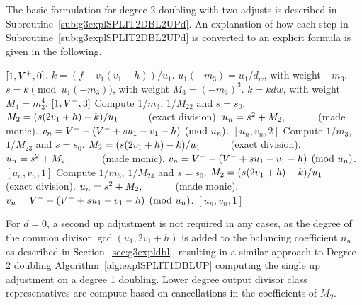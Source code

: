 The basic formulation for degree 2 doubling with two adjusts is described in
Subroutine~\ref{sub:g3explSPLIT2DBL2UPd}. An explanation of how each step in
Subroutine~\ref{sub:g3explSPLIT2DBL2UPd} is converted to an explicit formula is
given in the following.

\begin{algorithm}[htbp]
\caption{Genus 3 Split Model Degree 2 Doubling with two Up Adjusts ($d = 0$)\label{sub:g3explSPLIT2DBL2UPd}}
\begin{algorithmic} [1]
 \hspace{1pt} \Return $[1,V^{+},0]$.
\EndIf
\State $k = (f - v_1(v_1 + h))/u_1$.
\State $u_1(-m_3) = u_1/d_w$, with weight $-m_3$.
\State $s = k \pmod{u_1(-m_3)}$, with weight $M_3 = (-m_3)^3$.
\State $k = kdw$, with weight $M_4 = m_3^4$.
         \Return $[1,V^{-},3]$
        \Else \hspace{3pt} Compute $1/m_3$, $1/M_{22}$ and $s = s_0$.
            \State $M_2 = (s(2v_1 + h) - k)/u_1 \quad\quad\quad $(exact division).
            \State $u_n = s^2 + M_2, \quad\quad\quad $ (made monic).
            \State $v_n = V^{-} - (V^{-} + su_1 - v_1 - h) \pmod{u_n}$.
            \State \Return $[u_n,v_n,2]$
        \EndIf
    \Else \hspace{3pt} Compute $1/m_3$, $1/M_{23}$ and $s = s_0$.
        \State $M_2 = (s(2v_1 + h) - k)/u_1 \quad\quad\quad $(exact division).
        \State $u_n = s^2 + M_2, \quad\quad\quad $ (made monic).
        \State $v_n = V^{-} - (V^{-} + su_1 - v_1 - h) \pmod{u_n}$.
        \State \Return $[u_n,v_n,1]$
    \EndIf
\EndIf
\State Compute $1/m_3$, $1/M_{24}$ and $s = s_0$.
\State $M_2 = (s(2v_1 + h) - k)/u_1 \quad\quad\quad $(exact division).
\State $u_n = s^2 + M_2, \quad\quad\quad $ (made monic).
\State $v_n = V^{-} - (V^{-} + su_1 - v_1 - h) \pmod{u_n}$.
\State \Return $[u_n,v_n,1]$
\end{algorithmic}
\end{algorithm}
For $d=0$, a second up adjustment is not required in any cases, as the degree of
the common divisor $\gcd(u_1,2v_1 + h)$ is added to the balancing coefficient
$n_n$ as described in Section~\ref{sec:g3expldbl}, resulting in a similar
approach to Degree 2 doubling Algorithm~\ref{alg:explSPLIT1DBLUP} computing the
single up adjustment on a degree 1 doubling. Lower degree output divisor class
representatives are compute based on cancellations in the coefficients of $M_2$.

